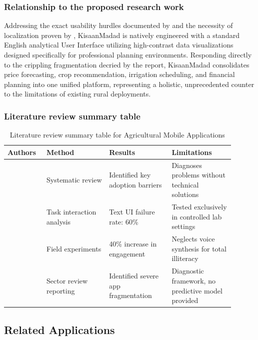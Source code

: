 \subsubsection{Relationship to the proposed research work}
Addressing the exact usability hurdles documented by \cite{rehman2023usability} and the necessity of localization proven by \cite{singh2021impact}, KisaanMadad is natively engineered with a standard English analytical User Interface utilizing high-contrast data visualizations designed specifically for professional planning environments. Responding directly to the crippling fragmentation decried by the \cite{pasha2024agritech} report, KisaanMadad consolidates price forecasting, crop recommendation, irrigation scheduling, and financial planning into one unified platform, representing a holistic, unprecedented counter to the limitations of existing rural deployments.

\subsubsection{Literature review summary table}
\begin{table}[htbp]
  \centering
  \caption{Literature review summary table for Agricultural Mobile Applications}
  \label{tab:mobile_apps}
  \begin{tabular}{p{0.15\linewidth} p{0.25\linewidth} p{0.25\linewidth} p{0.25\linewidth}}
    \toprule
    \textbf{Authors} & \textbf{Method} & \textbf{Results} & \textbf{Limitations} \\
    \midrule
    \cite{hassan2022adoption} & Systematic review & Identified key adoption barriers & Diagnoses problems without technical solutions \\
    \cite{rehman2023usability} & Task interaction analysis & Text UI failure rate: 60\% & Tested exclusively in controlled lab settings \\
    \cite{singh2021impact} & Field experiments & 40\% increase in engagement & Neglects voice synthesis for total illiteracy \\
    \cite{pasha2024agritech} & Sector review reporting & Identified severe app fragmentation & Diagnostic framework, no predictive model provided \\
    \bottomrule
  \end{tabular}
\end{table}

\subsection{Related Applications}

